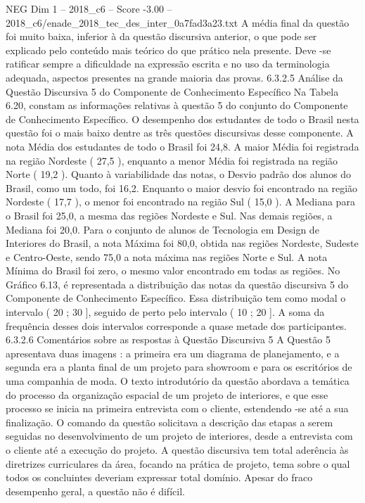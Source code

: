 \begin{textsample}{NEG Dim 1 – 2018\_c6 – Score -3.00 – 2018\_c6/enade\_2018\_tec\_des\_inter\_0a7fad3a23.txt}
A média final da questão foi muito baixa, inferior à da questão discursiva anterior, o que pode ser explicado pelo conteúdo mais teórico do que prático nela presente.
Deve -se ratificar sempre a dificuldade na expressão escrita e no uso da terminologia adequada, aspectos presentes na grande maioria das provas. 6.3.2.5 Análise da Questão Discursiva 5 do Componente de Conhecimento Específico Na Tabela 6.20, constam as informações relativas à questão 5 do conjunto do Componente de Conhecimento Específico.
O desempenho dos estudantes de todo o Brasil nesta questão foi o mais baixo dentre as três questões discursivas desse componente.
A nota Média dos estudantes de todo o Brasil foi 24,8.
A maior Média foi registrada na região Nordeste ( 27,5 ), enquanto a menor Média foi registrada na região Norte ( 19,2 ).
Quanto à variabilidade das notas, o Desvio padrão dos alunos do Brasil, como um todo, foi 16,2.
Enquanto o maior desvio foi encontrado na região Nordeste ( 17,7 ), o menor foi encontrado na região Sul ( 15,0 ).
A Mediana para o Brasil foi 25,0, a mesma das regiões Nordeste e Sul.
Nas demais regiões, a Mediana foi 20,0.
Para o conjunto de alunos de Tecnologia em Design de Interiores do Brasil, a nota Máxima foi 80,0, obtida nas regiões Nordeste, Sudeste e Centro-Oeste, sendo 75,0 a nota máxima nas regiões Norte e Sul.
A nota Mínima do Brasil foi zero, o mesmo valor encontrado em todas as regiões.
No Gráfico 6.13, é representada a distribuição das notas da questão discursiva 5 do Componente de Conhecimento Específico.
Essa distribuição tem como modal o intervalo ( 20 ; 30 ], seguido de perto pelo intervalo ( 10 ; 20 ].
A soma da frequência desses dois intervalos corresponde a quase metade dos participantes. 6.3.2.6 Comentários sobre as respostas à Questão Discursiva 5 A Questão 5 apresentava duas imagens : a primeira era um diagrama de planejamento, e a segunda era a planta final de um projeto para showroom e para os escritórios de uma companhia de moda.
O texto introdutório da questão abordava a temática do processo da organização espacial de um projeto de interiores, e que esse processo se inicia na primeira entrevista com o cliente, estendendo -se até a sua finalização.
O comando da questão solicitava a descrição das etapas a serem seguidas no desenvolvimento de um projeto de interiores, desde a entrevista com o cliente até a execução do projeto.
A questão discursiva tem total aderência às diretrizes curriculares da área, focando na prática de projeto, tema sobre o qual todos os concluintes deveriam expressar total domínio.
Apesar do fraco desempenho geral, a questão não é difícil.

\end{textsample}
